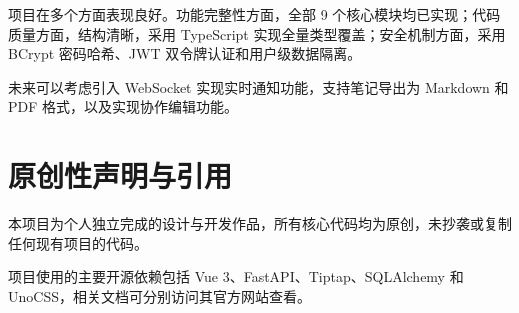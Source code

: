 \documentclass[12pt,a4paper]{article}
\begin{document}
项目在多个方面表现良好。功能完整性方面，全部 9 个核心模块均已实现；代码质量方面，结构清晰，采用 TypeScript 实现全量类型覆盖；安全机制方面，采用 BCrypt 密码哈希、JWT 双令牌认证和用户级数据隔离。

未来可以考虑引入 WebSocket 实现实时通知功能，支持笔记导出为 Markdown 和 PDF 格式，以及实现协作编辑功能。

\section{原创性声明与引用}

本项目为个人独立完成的设计与开发作品，所有核心代码均为原创，未抄袭或复制任何现有项目的代码。

项目使用的主要开源依赖包括 Vue 3、FastAPI、Tiptap、SQLAlchemy 和 UnoCSS，相关文档可分别访问其官方网站查看。
\end{document}
